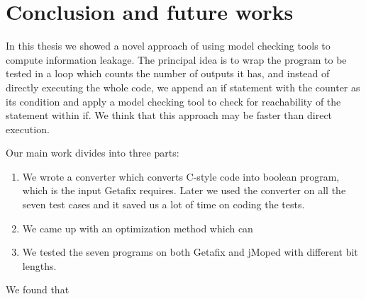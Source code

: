 \chapter{Conclusion and future works}
	\label{CH_summary}

In this thesis we showed a novel approach of using model checking tools to compute information leakage. The principal idea is to wrap the program to be tested in a loop which counts the number of outputs it has, and instead of directly executing the whole code, we append an if statement with the counter as its condition and apply a model checking tool to check for reachability of the statement within if. We think that this approach may be faster than direct execution.

Our main work divides into three parts:
\begin{enumerate}
\item We wrote a converter which converts C-style code into boolean program, which is the input Getafix requires. Later we used the converter on all the seven test cases and it saved us a lot of time on coding the tests. 
\item We came up with an optimization method which can 
\item We tested the seven programs on both Getafix and jMoped with different bit lengths.
\end{enumerate}

We found that 